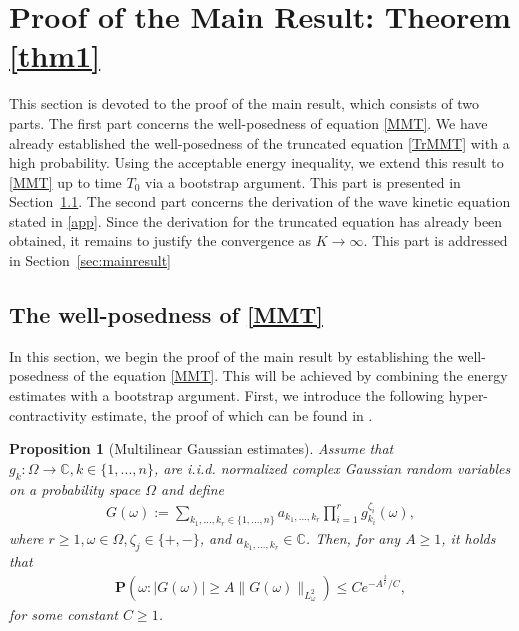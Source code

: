 \documentclass[UTF-8,reqno]{amsart}
\numberwithin{equation}{section}
\newtheorem{proposition}[theorem]{Proposition}
\theoremstyle{definition}
\def\geq{\geqslant}
\def\leq{\leqslant}
\def\geq{\geqslant}
\def\leq{\leqslant}
\begin{document}
\section{Proof of the Main Result: Theorem \ref{thm1}}\label{sec:proofthm1}
This section is devoted to the proof of the main result, which consists of two parts.
The first part concerns the well-posedness of equation \eqref{MMT}.
We have already established the well-posedness of the truncated equation \eqref{TrMMT} with a high probability.
Using the acceptable  energy inequality, we extend this result to \eqref{MMT} up to time $T_0$ via a bootstrap argument.
This part is presented in Section~\ref{sec:well-posed}.
The second part concerns the derivation of the wave kinetic equation stated in \eqref{app}.
Since the derivation for the truncated equation has already been obtained, it remains to justify the convergence as $K \to \infty$.
This part is addressed in Section~\ref{sec:mainresult}

 

\subsection{The well-posedness of \eqref{MMT}}\label{sec:well-posed}
In this section, we begin the proof of the main result by establishing the well-posedness of the equation \eqref{MMT}. This will be achieved by combining the energy estimates with a bootstrap argument. First, we introduce the following hyper-contractivity  estimate, the proof of which can be found in \cite[Proposition 2.2]{DIP25}.
 
\begin{proposition}[Multilinear Gaussian estimates] \label{prop:dapiancha}
Assume that $g_k : \Omega \to \mathbb{C}, k \in \{1,...,n\}$,
 are i.i.d. normalized complex Gaussian random variables on a probability space $\Omega$ and define
 \begin{align*}
 G(\omega) :=\sum_{k_1,...,k_r\in\{1,...,n\}}
 a_{k_1,...,k_r} \prod _{i=1}^rg^{\zeta_i}_{k_i}(\omega),
 \end{align*}
 where $r \geq 1, \omega \in\Omega, \zeta_j \in \{+,-\}$, and $ a_{k_1,...,k_r}\in\mathbb{C}$. Then, for any $A \geq 1$, it holds that
 \begin{align*}
     \mathbf{P}(\omega: |G(\omega)| \geq A\|G(\omega)\|_{L^2_{\omega}})
 \leq  Ce^{-A^{\frac2r}/C},
 \end{align*}
 for some constant $C \geq 1$.
\end{proposition}
\end{document}
